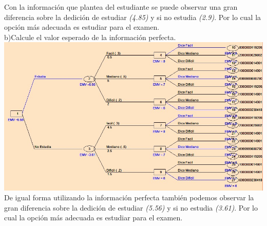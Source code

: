 \documentclass[spanish]{article}
\begin{document}
\begin{center}
\justify
Con la información que plantea del estudiante se puede observar una gran diferencia sobre la dedición de estudiar \emph{(4.85)} y si no estudia \emph{(2.9)}. Por lo cual la opción más adecuada es estudiar para el examen.\\

\hspace{10mm} b)Calcule el valor esperado de la información perfecta.\\

\includegraphics[width=1.0\linewidth,height=0.3\textheight]{arbol3.jpg}\\

\justify
De igual forma utilizando la información perfecta también podemos observar la gran diferencia sobre la dedición de estudiar \emph{(5.56)} y si no estudia \emph{(3.61)}. Por lo cual la opción más adecuada es estudiar para el examen.

\end{center}
\end{document}
